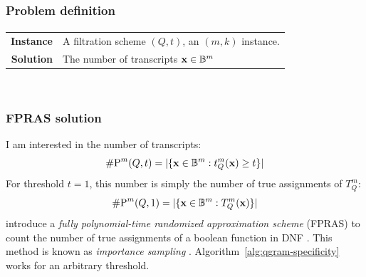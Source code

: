 \subsubsection{Problem definition}

\paragraph{}
\begin{tabular}{rl}
{\bf Instance}	&	A filtration scheme $(Q,t)$, an $(m,k)$ instance.\\
{\bf Solution}	&	The number of transcripts $\mathbf{x} \in \mathbb {B}^{m}$ \st $t_{Q}^{m}(\mathbf{x}) \geq t$\\
\end{tabular}
\\


\subsubsection{FPRAS solution}

I am interested in the number of transcripts:
\begin{equation}
\text{\#P}^{m}(Q,t) = | \{ \mathbf{x} \in \mathbb {B}^{m} : t_{Q}^{m}(\mathbf{x}) \geq t \} |
\end{equation}
For threshold $t=1$, this number is simply the number of true assignments of $T_{Q}^{m}$:
\begin{equation}
\text{\#P}^{m}(Q,1) = | \{ \mathbf{x} \in \mathbb {B}^{m} : T_{Q}^{m}(\mathbf{x}) \} |
\end{equation}
\citeauthor{Karp1989} introduce a \emph{fully polynomial-time randomized approximation scheme} (FPRAS) \citep{Vazirani2001} to count the number of true assignments of a boolean function in DNF \citep{Karp1989}.
This method is known as \emph{importance sampling} \citep{Vazirani2001}.
Algorithm~\ref{alg:qgram-specificity} works for an arbitrary threshold.

